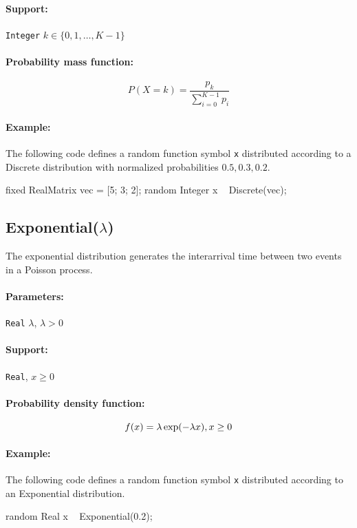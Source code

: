 \paragraph*{Support:} \verb|Integer| $k \in \{0, 1, \ldots, K-1 \}$ 

\paragraph*{Probability mass function:}
\[
	P(X = k) = \frac{p_{k}}{\sum_{i=0}^{K -1} p_{i}}
\]

\paragraph*{Example:}
The following code defines a random function symbol \verb|x| distributed according to a Discrete distribution with normalized probabilities $0.5, 0.3, 0.2$.
\begin{blogcode}
fixed RealMatrix vec = [5; 3; 2];
random Integer x ~ Discrete(vec);
\end{blogcode}

\subsection{Exponential($\lambda$)} 
The exponential distribution generates the interarrival time between two events in a Poisson process.

\paragraph*{Parameters:} 
\begin{itemize*}
\item[] \verb|Real|
 $\lambda$, $\lambda > 0$ 
\end{itemize*}
\paragraph*{Support:} \verb|Real|, $x \geq 0$ 

\paragraph*{Probability density function:}
\[
	f(x) = \lambda \exp(-\lambda x) , x \geq 0 \\
\]

\paragraph*{Example:}
The following code defines a random function symbol \verb|x| distributed according to an Exponential distribution.
\begin{blogcode}
random Real x ~ Exponential(0.2);
\end{blogcode}

